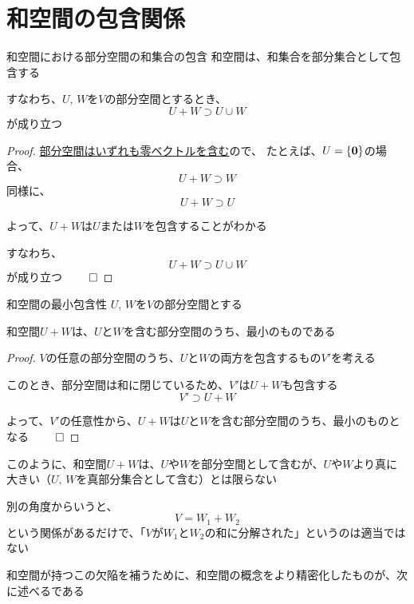 \documentclass[../../../topic_linear-algebra]{subfiles}
\begin{document}
\sectionline
\section{和空間の包含関係}

\begin{theorem}{和空間における部分空間の和集合の包含}
  和空間は、和集合を部分集合として包含する

  すなわち、$U,\,W$を$V$の部分空間とするとき、
  \begin{equation*}
    U + W \supset U \cup W
  \end{equation*}
  が成り立つ
\end{theorem}

\begin{proof}
  \hyperref[thm:subspace-contains-zero]{部分空間はいずれも零ベクトルを含む}ので、
  たとえば、$U = \{ \vb*{0} \}$の場合、
  \begin{equation*}
    U + W \supset W
  \end{equation*}
  同様に、
  \begin{equation*}
    U + W \supset U
  \end{equation*}

  よって、$U+W$は$U$または$W$を包含することがわかる

  すなわち、
  \begin{equation*}
    U + W \supset U \cup W
  \end{equation*}
  が成り立つ $\qed$
\end{proof}

\sectionline

\begin{theorem}{和空間の最小包含性}
  $U,\,W$を$V$の部分空間とする

  和空間$U+W$は、$U$と$W$を含む部分空間のうち、最小のものである
\end{theorem}

\begin{proof}
  $V$の任意の部分空間のうち、$U$と$W$の両方を包含するもの$V'$を考える

  このとき、部分空間は和に閉じているため、$V'$は$U+W$も包含する
  \begin{equation*}
    V' \supset U + W
  \end{equation*}

  よって、$V'$の任意性から、$U + W$は$U$と$W$を含む部分空間のうち、最小のものとなる $\qed$
\end{proof}

\sectionline

このように、和空間$U+W$は、$U$や$W$を部分空間として含むが、$U$や$W$より真に大きい（$U,\,W$を真部分集合として含む）とは限らない

\br

別の角度からいうと、
\begin{equation*}
  V = W_1 + W_2
\end{equation*}
という関係があるだけで、「$V$が$W_1$と$W_2$の和に分解された」というのは適当ではない

\br

和空間が持つこの欠陥を補うために、和空間の概念をより精密化したものが、次に述べるである
\end{document}
